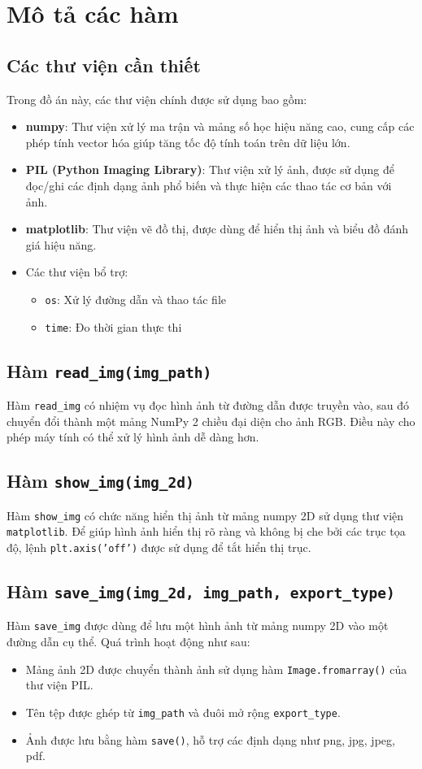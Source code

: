 \section{Mô tả các hàm}
\subsection{Các thư viện cần thiết}
Trong đồ án này, các thư viện chính được sử dụng bao gồm:
\begin{itemize}
	\item \textbf{numpy}: Thư viện xử lý ma trận và mảng số học hiệu năng cao, cung cấp các phép tính vector hóa giúp tăng tốc độ tính toán trên dữ liệu lớn.
	\item \textbf{PIL (Python Imaging Library)}: Thư viện xử lý ảnh, được sử dụng để đọc/ghi các định dạng ảnh phổ biến và thực hiện các thao tác cơ bản với ảnh.
	\item \textbf{matplotlib}: Thư viện vẽ đồ thị, được dùng để hiển thị ảnh và biểu đồ đánh giá hiệu năng.

	\item Các thư viện bổ trợ:
	      \begin{itemize}
		      \item \texttt{os}: Xử lý đường dẫn và thao tác file
		      \item \texttt{time}: Đo thời gian thực thi
	      \end{itemize}
\end{itemize}

\subsection{Hàm \texttt{read\_img(img\_path)}}
Hàm \texttt{read\_img} có nhiệm vụ đọc hình ảnh từ đường dẫn được truyền vào, sau đó chuyển đổi thành một mảng NumPy 2 chiều đại diện cho ảnh RGB. Điều này cho phép máy tính có thể xử lý hình ảnh dễ dàng hơn.

\subsection{Hàm \texttt{show\_img(img\_2d)}}
Hàm \texttt{show\_img} có chức năng hiển thị ảnh từ mảng numpy 2D sử dụng thư viện \texttt{matplotlib}. Để giúp hình ảnh hiển thị rõ ràng và không bị che bởi các trục tọa độ, lệnh \texttt{plt.axis('off')} được sử dụng để tắt hiển thị trục.

\subsection{Hàm \texttt{save\_img(img\_2d, img\_path, export\_type)}}
Hàm \texttt{save\_img} được dùng để lưu một hình ảnh từ mảng numpy 2D vào một đường dẫn cụ thể. Quá trình hoạt động như sau:
\begin{itemize}
	\item Mảng ảnh 2D được chuyển thành ảnh sử dụng hàm \texttt{Image.fromarray()} của thư viện PIL.
	\item Tên tệp được ghép từ \texttt{img\_path} và đuôi mở rộng \texttt{export\_type}.
	\item Ảnh được lưu bằng hàm \texttt{save()}, hỗ trợ các định dạng như png, jpg, jpeg, pdf.
\end{itemize}


